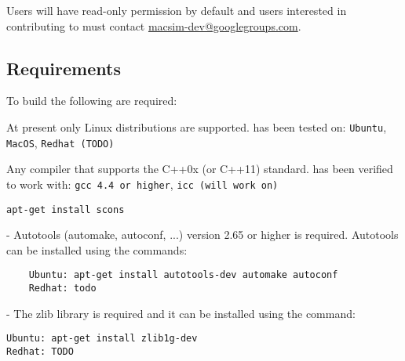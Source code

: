 Users will have read-only permission by default and users interested
in contributing to \SIM must contact
\href{mailto:macsim-dev@googlegroups.com}{macsim-dev@googlegroups.com}.



\subsection{Requirements}

To build \SIM the following are required:

\begingroup
\renewcommand\descriptionlabel[1]{\textit{\hspace\labelsep{#1}}}
\begin{description}\firmlist
  \item[Operating System] At present only Linux distributions are supported. \SIM has been tested on:
   \Verb+Ubuntu+, \Verb+MacOS+, \Verb+Redhat (TODO)+
  \item[Compiler] Any compiler that supports the C++0x (or C++11)
    standard. \SIM has been verified to work with: \Verb+gcc 4.4 or higher+, \Verb+icc (will work on)+
  \item[SConstruct]

    \Verb+apt-get install scons+

\ignore
	 {
	  \item[Autotools] - Autotools (automake, autoconf,
		...) version 2.65 or higher is required. Autotools can be installed using the commands:
	\begin{Verbatim}
	Ubuntu: apt-get install autotools-dev automake autoconf
	Redhat: todo
	\end{Verbatim}
	}
  
  \item[Libraries] - The zlib library is required and it can be installed using the command:
\begin{Verbatim}
Ubuntu: apt-get install zlib1g-dev
Redhat: TODO
\end{Verbatim}
\end{description}
\endgroup




